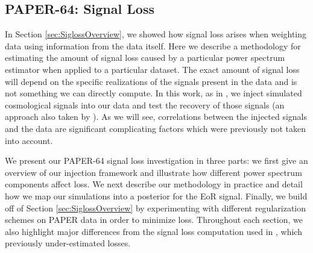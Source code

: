 \documentclass[preprint2,numberedappendix,tighten]{aastex6}  %
\begin{document}

\subsection{PAPER-64: Signal Loss}
\label{sec:Sigloss}

In Section \ref{sec:SiglossOverview}, we showed how signal loss arises when weighting data using information from the data itself. Here we describe a methodology for estimating the amount of signal loss caused by a particular power spectrum estimator when applied to a particular dataset. The exact amount of signal loss will depend on the specific realizations of the signals present in the data and is not something we can directly compute. In this work, as in , we inject simulated cosmological signals into our data and test the recovery of those signals (an approach also taken by \citet{masui_et_al2013}). As we will see, correlations between the injected signals and the data are significant complicating factors which were previously not taken into account. 

We present our PAPER-64 signal loss investigation in three parts: we first give an overview of our injection framework and illustrate how different power spectrum components affect loss. We next describe our methodology in practice and detail how we map our simulations into a posterior for the EoR signal. Finally, we build off of Section \ref{sec:SiglossOverview} by experimenting with different regularization schemes on PAPER data in order to minimize loss. Throughout each section, we also highlight major differences from the signal loss computation used in , which previously under-estimated losses.

\end{document}

